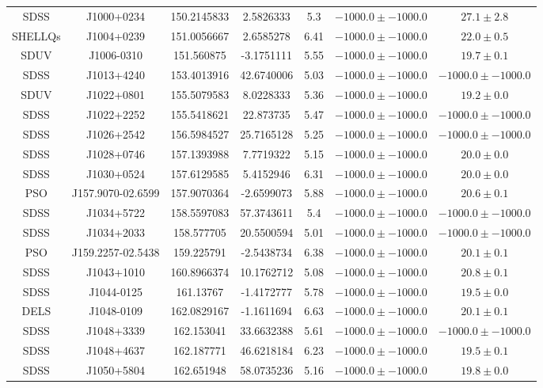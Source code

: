 \begin{table}
\begin{tabular}{ccccccc}
SDSS & J1000+0234 & 150.2145833 & 2.5826333 & 5.3 & $-1000.0\pm-1000.0$ & $  27.1\pm  2.8$ \\
SHELLQs & J1004+0239 & 151.0056667 & 2.6585278 & 6.41 & $-1000.0\pm-1000.0$ & $  22.0\pm  0.5$ \\
SDUV & J1006-0310 & 151.560875 & -3.1751111 & 5.55 & $-1000.0\pm-1000.0$ & $  19.7\pm  0.1$ \\
SDSS & J1013+4240 & 153.4013916 & 42.6740006 & 5.03 & $-1000.0\pm-1000.0$ & $-1000.0\pm-1000.0$ \\
SDUV & J1022+0801 & 155.5079583 & 8.0228333 & 5.36 & $-1000.0\pm-1000.0$ & $  19.2\pm  0.0$ \\
SDSS & J1022+2252 & 155.5418621 & 22.873735 & 5.47 & $-1000.0\pm-1000.0$ & $-1000.0\pm-1000.0$ \\
SDSS & J1026+2542 & 156.5984527 & 25.7165128 & 5.25 & $-1000.0\pm-1000.0$ & $-1000.0\pm-1000.0$ \\
SDSS & J1028+0746 & 157.1393988 & 7.7719322 & 5.15 & $-1000.0\pm-1000.0$ & $  20.0\pm  0.0$ \\
SDSS & J1030+0524 & 157.6129585 & 5.4152946 & 6.31 & $-1000.0\pm-1000.0$ & $  20.0\pm  0.0$ \\
PSO & J157.9070-02.6599 & 157.9070364 & -2.6599073 & 5.88 & $-1000.0\pm-1000.0$ & $  20.6\pm  0.1$ \\
SDSS & J1034+5722 & 158.5597083 & 57.3743611 & 5.4 & $-1000.0\pm-1000.0$ & $-1000.0\pm-1000.0$ \\
SDSS & J1034+2033 & 158.577705 & 20.5500594 & 5.01 & $-1000.0\pm-1000.0$ & $-1000.0\pm-1000.0$ \\
PSO & J159.2257-02.5438 & 159.225791 & -2.5438734 & 6.38 & $-1000.0\pm-1000.0$ & $  20.1\pm  0.1$ \\
SDSS & J1043+1010 & 160.8966374 & 10.1762712 & 5.08 & $-1000.0\pm-1000.0$ & $  20.8\pm  0.1$ \\
SDSS & J1044-0125 & 161.13767 & -1.4172777 & 5.78 & $-1000.0\pm-1000.0$ & $  19.5\pm  0.0$ \\
DELS & J1048-0109 & 162.0829167 & -1.1611694 & 6.63 & $-1000.0\pm-1000.0$ & $  20.1\pm  0.1$ \\
SDSS & J1048+3339 & 162.153041 & 33.6632388 & 5.61 & $-1000.0\pm-1000.0$ & $-1000.0\pm-1000.0$ \\
SDSS & J1048+4637 & 162.187771 & 46.6218184 & 6.23 & $-1000.0\pm-1000.0$ & $  19.5\pm  0.1$ \\
SDSS & J1050+5804 & 162.651948 & 58.0735236 & 5.16 & $-1000.0\pm-1000.0$ & $  19.8\pm  0.0$ \\

\end{tabular}
\end{table}
